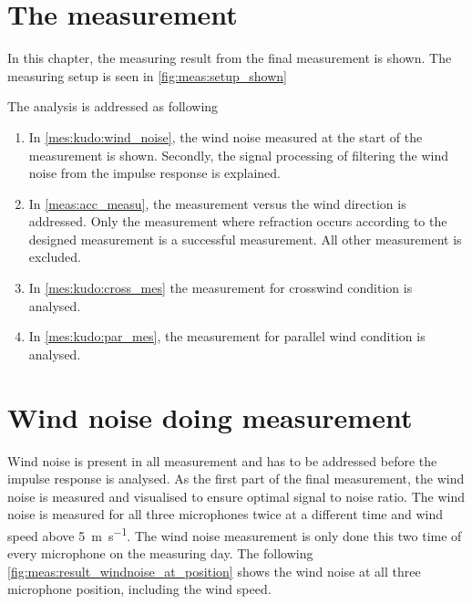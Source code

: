 \section{The measurement}\label{meas:meas_of_kudo}
In this chapter, the measuring result from the final measurement is shown. The measuring setup is seen in \autoref{fig:meas:setup_shown}



The analysis is addressed as following  



\begin{enumerate}
\item In \autoref{mes:kudo:wind_noise}, the wind noise measured at the start of the measurement is shown.  Secondly, the signal processing of filtering the wind noise from the impulse response is explained.
\item In \autoref{meas:acc_measu}, the measurement versus the wind direction is addressed. Only the measurement where refraction occurs according to the designed measurement is a successful measurement. All other measurement is excluded.
\item In \autoref{mes:kudo:cross_mes} the measurement for crosswind condition is analysed.
\item In \autoref{mes:kudo:par_mes}, the measurement for parallel wind condition is analysed.
\end{enumerate}

    


\section{Wind noise doing measurement}\label{mes:kudo:wind_noise}
Wind noise is present in all measurement and has to be addressed before the impulse response is analysed. As the first part of the final measurement, the wind noise is measured and visualised to ensure optimal signal to noise ratio. The wind noise is measured for all three microphones twice at a different time and wind speed above \SI{5}{\meter\per\second}. The wind noise measurement is only done this two time of every microphone on the measuring day. The following \autoref{fig:meas:result_windnoise_at_position} shows the wind noise at all three microphone position, including the wind speed.




